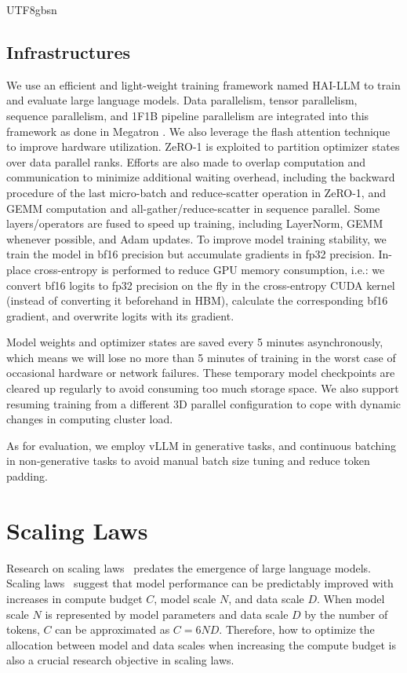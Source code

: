 \documentclass[11pt, a4paper, logo, copyright, nonumbering]{deepseek}
\begin{document}
\begin{CJK*}{UTF8}{gbsn}
\subsection{Infrastructures}
We use an efficient and light-weight training framework named HAI-LLM \citep{haillm} to train and evaluate large language models. Data parallelism, tensor parallelism, sequence parallelism, and 1F1B pipeline parallelism are integrated into this framework as done in Megatron \citep{megatron, megatron2, megatron3}. We also leverage the flash attention \citep{dao2022flashattention, dao2023flashattention2} technique to improve hardware utilization. ZeRO-1 \citep{zero} is exploited to partition optimizer states over data parallel ranks. Efforts are also made to overlap computation and communication to minimize additional waiting overhead, including the backward procedure of the last micro-batch and reduce-scatter operation in ZeRO-1, and GEMM computation and all-gather/reduce-scatter in sequence parallel. Some layers/operators are fused to speed up training, including LayerNorm, GEMM whenever possible, and Adam updates. To improve model training stability, we train the model in bf16 precision but accumulate gradients in fp32 precision. In-place cross-entropy is performed to reduce GPU memory consumption, i.e.: we convert bf16 logits to fp32 precision on the fly in the cross-entropy CUDA kernel (instead of converting it beforehand in HBM), calculate the corresponding bf16 gradient, and overwrite logits with its gradient.

Model weights and optimizer states are saved every 5 minutes asynchronously, which means we will lose no more than 5 minutes of training in the worst case of occasional hardware or network failures. These temporary model checkpoints are cleared up regularly to avoid consuming too much storage space. We also support resuming training from a different 3D parallel configuration to cope with dynamic changes in computing cluster load.

As for evaluation, we employ vLLM \citep{vllm} in generative tasks, and continuous batching in non-generative tasks to avoid manual batch size tuning and reduce token padding.

\section{Scaling Laws}
\label{sec:scaling}
Research on scaling laws~\citep{hestness2017deep} predates the emergence of large language models. Scaling laws~\citep{scalinglaw,henighan2020scaling,chinchilla} suggest that model performance can be predictably improved with increases in compute budget $C$, model scale $N$, and data scale $D$. 
When model scale $N$ is represented by model parameters and data scale $D$ by the number of tokens, $C$ can be approximated as $C=6ND$. Therefore, how to optimize the allocation between model and data scales when increasing the compute budget is also a crucial research objective in scaling laws.


\end{CJK*}
\end{document}
